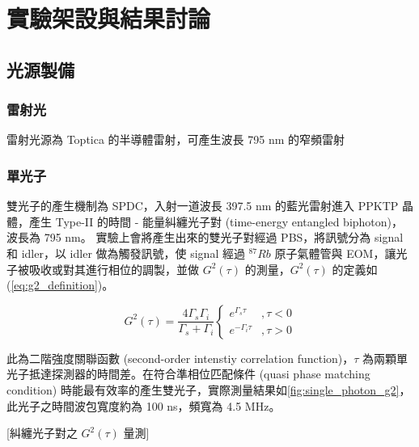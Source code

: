 \documentclass[class=NCU_thesis, crop=false]{standalone}
\begin{document}
\chapter{實驗架設與結果討論}


\section{光源製備}

\subsection{雷射光}
雷射光源為 Toptica 的半導體雷射，可產生波長 795 nm 的窄頻雷射

\subsection{單光子}
\label{subsection:single_photon}
雙光子的產生機制為 SPDC，入射一道波長 397.5 nm 的藍光雷射進入 PPKTP 晶體，產生 Type-II 的時間 - 能量糾纏光子對 (time-energy entangled biphoton)，波長為 795 nm。
實驗上會將產生出來的雙光子對經過 PBS，將訊號分為 signal 和 idler，以 idler 做為觸發訊號，使 signal 經過 $^{87}Rb$ 原子氣體管與 EOM，讓光子被吸收或對其進行相位的調製，並做 $G^{2}(\tau)$ 的測量，$G^{2}(\tau)$ 的定義如 (\ref{eq:g2_definition})。

\begin{equation}
    G^{2}(\tau)=\frac{4\Gamma_{s}\Gamma_{i}}{\Gamma_{s}+\Gamma_{i}}\left\{\begin{matrix}
        e^{\Gamma_{s}\tau} & ,\tau<0\\
        e^{-\Gamma_{i}\tau} & ,\tau>0
        \end{matrix}\right.
\label{eq:g2_definition}
\end{equation}

此為二階強度關聯函數 (second-order intenstiy correlation function)，$\tau$ 為兩顆單光子抵達探測器的時間差。在符合準相位匹配條件 (quasi phase matching condition) 時能最有效率的產生雙光子，實際測量結果如\cref{fig:single_photon_g2}，此光子之時間波包寬度約為 100 ns，頻寬為 4.5 MHz。

[糾纏光子對之 $G^{2}(\tau)$ 量測]
\end{document}
